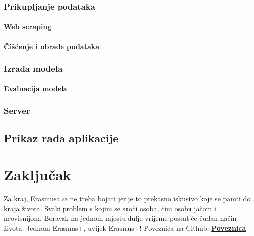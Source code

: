 \documentclass[]{foi}
\begin{document}
\subsection{Prikupljanje podataka}
\subsubsection{Web scraping}
\subsubsection{Čišćenje i obrada podataka}
\subsection{Izrada modela}
\subsubsection{Evaluacija modela}
\subsection{Server}
\section{Prikaz rada aplikacije}




\chapter{Zaključak}



Za kraj, Erasmusa se ne treba bojati jer je to prekasno iskustvo koje se pamti do kraja života. Svaki problem s kojim se suoči osoba, čini osobu jačom i neovisnijom. 
Boravak na jednom mjestu dulje vrijeme postat će čudan način života. Jednom Erasmus+, uvijek Erasmus+!
Poveznica na Github: \href{https://github.com/ababic20/Website-with-a-chatbot.git}{\textbf{Poveznica}} 

\makebackmatter
\end{document}
